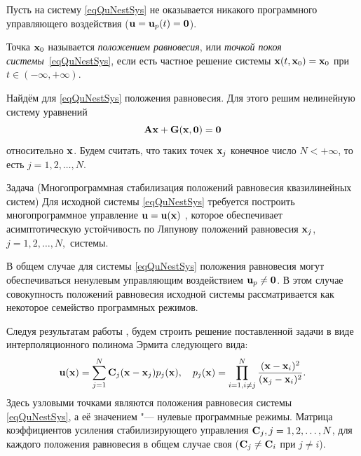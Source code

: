 Пусть на систему \eqref{eqQuNestSys} не оказывается никакого
программного управляющего воздействия (${\bf u}={\bf u}_p(t)=\mathbf{0}$).

\smallskip

\begin{definition}Точка ${\bf x}_0$ называется {\it положением равновесия}, или {\it
точкой покоя системы}~\eqref{eqQuNestSys}, если есть частное
решение системы ${\bf x}(t,{\bf x}_0)={\bf x}_0$ при $t\in(-\infty,+\infty)$.
\end{definition}

Найдём для \eqref{eqQuNestSys} положения равновесия. Для этого
решим нелинейную систему уравнений
\begin{equation}
{\bf A}{\bf x}+{\bf G}({\bf x},\mathbf{0})=\mathbf{0} \label{eqUrPolRavn}
\end{equation}
относительно ${\bf x}$. Будем считать, что таких точек ${\bf x}_j$
конечное число $N<+\infty$, то есть $j=1, 2, \dots, N$.

\begin{newthm}{Задача (Многопрограммная стабилизация положений равновесия
квазилинейных систем)} Для исходной системы \eqref{eqQuNestSys}
требуется построить многопрограммное управление ${\bf u}={\bf u}({\bf x})$
{\rm \cite{sha:bib:3}}{\rm ,} которое обеспечивает асимптотическую устойчивость по Ляпунову
положений равновесия ${\bf x}_j${\rm ,} $j=1, 2, \dots, N,$ системы{\rm .}
\end{newthm}

\begin{remark}
В общем случае для системы \eqref{eqQuNestSys} положения
равновесия могут обеспечиваться ненулевым управляющим воздействием
${\bf u}_p\neq\mathbf{0}$. В этом случае совокупность положений
равновесия исходной системы рассматривается как некоторое
семейство программных режимов.
\end{remark}

\smallskip

 Следуя результатам работы \cite{sha:bib:6}, будем
строить решение поставленной задачи в виде интерполяционного
полинома Эрмита следующего вида:
\begin{equation}
\label{eqMnUpr} {\bf u}({\bf x})=\sum^N_{j=1}{\bf C}_j({\bf x}-{\bf x}_j)p_j({\bf x}),
\quad p_j({\bf x})=\prod^N_{i=1,i\neq{j}}{({\bf x}-{\bf x}_i)^2
\over({\bf x}_j-{\bf x}_i)^2}.
\end{equation}
Здесь узловыми точками являются положения равновесия системы
\eqref{eqQuNestSys}, а её значением "--- нулевые программные режимы.
Матрица коэффициентов усиления стабилизирующего управления ${\bf C}_j,
j=1, 2, \dots, N$, для каждого положения равновесия в общем случае
своя (${\bf C}_j\neq{\bf C}_i$ при $j\neq i$).

